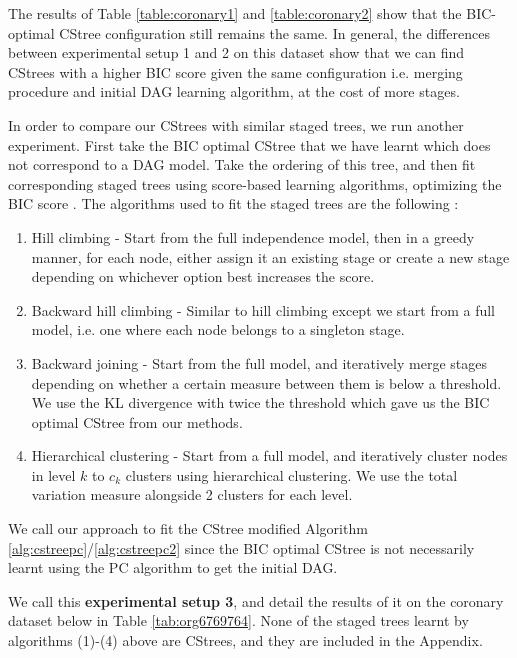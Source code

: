 \documentclass{tufte-book}
\begin{document}
The results of Table \ref{table:coronary1} and \ref{table:coronary2} show that the BIC-optimal CStree configuration still remains the same. In general, the differences between experimental setup 1 and 2 on this dataset show that we can find CStrees with a higher BIC score given the same configuration i.e. merging procedure and initial DAG learning algorithm, at the cost of more stages.




In order to compare our CStrees with similar staged trees, we run another experiment. First take the BIC optimal CStree that we have learnt which does not correspond to a DAG model. Take the ordering of this tree, and then fit corresponding staged trees using score-based learning algorithms, optimizing the BIC score \cite{carli-2020-r-packag}. The algorithms used to fit the staged trees are the following \cite{collazo-2018-chain}:


\begin{enumerate}
\item Hill climbing - Start from the full independence model, then in a greedy manner, for each node, either assign it an existing stage or create a new stage depending on whichever option best increases the score.
\item Backward hill climbing - Similar to hill climbing except we start from a full model, i.e. one where each node belongs to a singleton stage.
\item Backward joining - Start from the full model, and iteratively merge stages depending on whether a certain measure between them is below a threshold. We use the KL divergence with twice the threshold which gave us the BIC optimal CStree from our methods.
\item Hierarchical clustering - Start from a full model, and iteratively cluster nodes in level \(k\) to \(c_k\) clusters using hierarchical clustering. We use the total variation measure alongside 2 clusters for each level.
\end{enumerate}



We call our approach to fit the CStree modified Algorithm \ref{alg:cstreepc}/\ref{alg:cstreepc2} since the BIC optimal CStree is not necessarily learnt using the PC algorithm to get the initial DAG.

We call this \textbf{experimental setup 3}, and detail the results of it on the coronary dataset below in Table \ref{tab:org6769764}. None of the staged trees learnt by algorithms (1)-(4) above are CStrees, and they are included in the Appendix.
\end{document}
